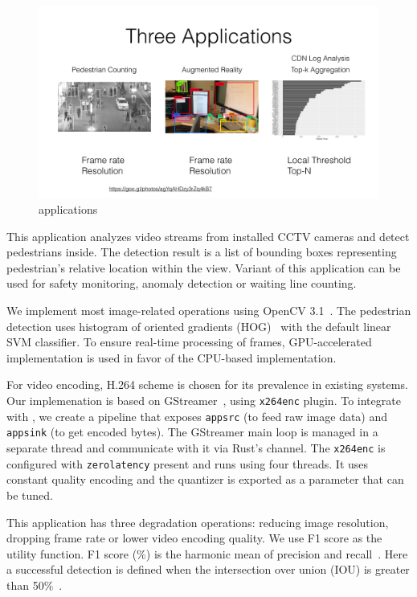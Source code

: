 \begin{figure}
  \centering
  \includegraphics[width=.95\textwidth]{figures/apps.pdf}
  \caption{\sysname{} applications}
  \label{fig:apps}
\end{figure}

 This application analyzes video streams from
installed CCTV cameras and detect pedestrians inside. The detection result is a
list of bounding boxes representing pedestrian's relative location within the
view. Variant of this application can be used for safety monitoring, anomaly
detection or waiting line counting.

We implement most image-related operations using OpenCV
3.1~\cite{opencvlibrary}. The pedestrian detection uses histogram of oriented
gradients (HOG)~\cite{dalal2005histograms} with the default linear SVM
classifier. To ensure real-time processing of frames, GPU-accelerated
implementation is used in favor of the CPU-based implementation.

For video encoding, H.264 scheme is chosen for its prevalence in existing
systems. Our implemenation is based on GStreamer~\cite{gstreamer}, using
\texttt{x264enc} plugin. To integrate with \sysname{}, we create a pipeline that
exposes \texttt{appsrc} (to feed raw image data) and \texttt{appsink} (to get
encoded bytes). The GStreamer main loop is managed in a separate thread and
\sysname{} communicate with it via Rust's channel. The \texttt{x264enc} is
configured with \texttt{zerolatency} present and runs using four threads. It
uses constant quality encoding and the quantizer is exported as a parameter that
can be tuned.

This application has three degradation operations: reducing image resolution,
dropping frame rate or lower video encoding quality. We use F1 score as the
utility function. F1 score (\%) is the harmonic mean of precision and
recall~\cite{Rijsbergen:1979:IR:539927}. Here a successful detection is defined
when the intersection over union (IOU) is greater than
50\%~\cite{everingham2010pascal}.

